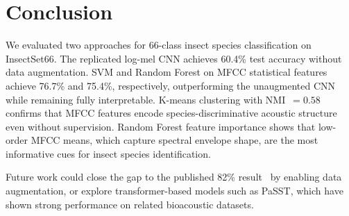 
\section{Conclusion}\label{sec:conclusion}

We evaluated two approaches for 66-class insect species classification on InsectSet66.
The replicated log-mel CNN achieves 60.4\% test accuracy without data augmentation.
SVM and Random Forest on MFCC statistical features achieve 76.7\% and 75.4\%, respectively, outperforming the unaugmented CNN while remaining fully interpretable.
K-means clustering with NMI~$= 0.58$ confirms that MFCC features encode species-discriminative acoustic structure even without supervision.
Random Forest feature importance shows that low-order MFCC means, which capture spectral envelope shape, are the most informative cues for insect species identification.

Future work could close the gap to the published 82\% result~\cite{faiss2023adaptive} by enabling data augmentation, or explore transformer-based models such as PaSST, which have shown strong performance on related bioacoustic datasets.
